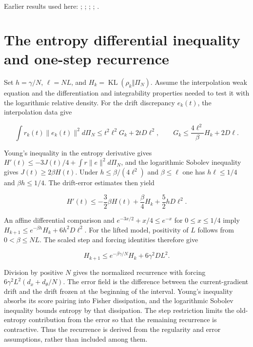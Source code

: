 \documentclass[11pt,a4paper]{article}
\begin{document}
Earlier results used here: \cite[Section~3.26.3]{LangevinLean2026ULASC}; \cite[Section~3.1.3]{LangevinLean2026ULALSI}; \cite[Section~3.34.1]{LangevinLean2026ULALSI}; \cite[Section~3.1.1]{LangevinLean2026IPLA}; \cite[Section~3.3.2]{LangevinLean2026IPLA}.

\section{\texorpdfstring{The entropy differential inequality and one-step recurrence}{The entropy differential inequality and one-step recurrence}}


Set \(h=\gamma/N\), \(\ell=NL\), and \(H_k=\operatorname{KL}(\rho_k\Vert\Pi_N)\). Assume the interpolation weak equation and the differentiation and integrability properties needed to test it with the logarithmic relative density. For the drift discrepancy \(e_k(t)\), the interpolation data give

\[\int r_k(t)\|e_k(t)\|^2d\Pi_N\le t^2\ell^2G_k+2tD\ell^2,\qquad G_k\le\frac{4\ell^2}{\beta}H_k+2D\ell.\]

Young’s inequality in the entropy derivative gives \(H'(t)\le-3J(t)/4+\int r\|e\|^2d\Pi_N\), and the logarithmic Sobolev inequality gives \(J(t)\ge2\beta H(t)\). Under \(h\le\beta/(4\ell^2)\) and \(\beta\le\ell\) one has \(h\ell\le1/4\) and \(\beta h\le1/4\). The drift-error estimates then yield

\[H'(t)\le-\frac32\beta H(t)+\frac\beta4H_k+\frac52hD\ell^2.\]

An affine differential comparison and \(e^{-3x/2}+x/4\le e^{-x}\) for \(0\le x\le1/4\) imply \(H_{k+1}\le e^{-\beta h}H_k+6h^2D\ell^2\). For the lifted model, positivity of \(L\) follows from \(0<\beta\le NL\). The scaled step and forcing identities therefore give

\[H_{k+1}\le e^{-\beta\gamma/N}H_k+6\gamma^2DL^2.\]

Division by positive \(N\) gives the normalized recurrence with forcing \(6\gamma^2L^2(d_x+d_\theta/N)\). The error field is the difference between the current-gradient drift and the drift frozen at the beginning of the interval. Young’s inequality absorbs its score pairing into Fisher dissipation, and the logarithmic Sobolev inequality bounds entropy by that dissipation. The step restriction limits the old-entropy contribution from the error so that the remaining recurrence is contractive. Thus the recurrence is derived from the regularity and error assumptions, rather than included among them.
\end{document}
